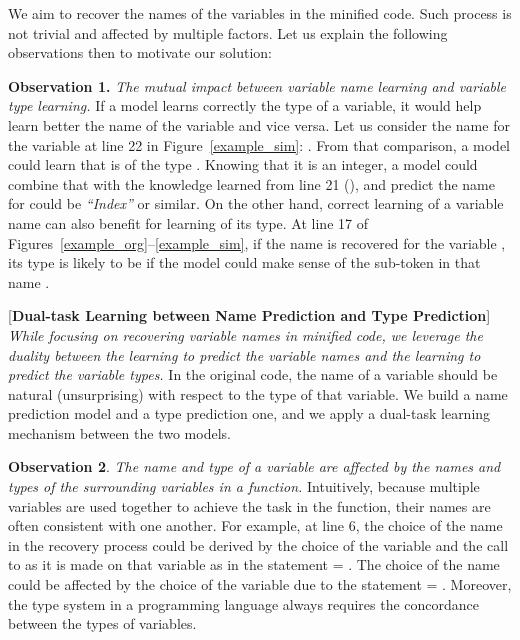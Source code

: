 We aim to recover the names of the variables in the minified
code. Such process is not trivial and affected by multiple factors.
Let us explain the following observations then to motivate our
solution:

\vspace{2pt} \textbf{Observation 1.} {\em The mutual impact between
  variable name learning and variable type learning.} If a model
learns correctly the type of a variable, it would help learn better
the name of the variable and vice versa. Let us consider the name
 for the variable  at line 22 in
Figure~\ref{example_sim}: . From that comparison, a
model could learn that  is of the type . Knowing
that it is an integer, a model could combine that with the knowledge
learned from line 21 (), and predict the
name for  could be {\em ``Index''} or similar. On the other
hand, correct learning of a variable name can also benefit for
learning of its type. At line 17 of
Figures~\ref{example_org}--\ref{example_sim}, if the name
 is recovered for the variable ,
its type is likely to be  if the model could make sense of
the sub-token  in that name .

\vspace{2pt}  [{\bf Dual-task Learning
    between Name Prediction and Type Prediction}] {\em While focusing
  on recovering variable names in minified code, we leverage the
  duality between the learning to predict the variable names and the
  learning to predict the variable types.} In the original code, the
name of a variable should be natural (unsurprising) with respect to
the type of that variable. We build a name prediction model and a type
prediction one, and we apply a dual-task learning mechanism between
the two models.

\vspace{2pt}
\textbf{Observation 2}. {\em The name and type of a variable are
  affected by the names and types of the surrounding variables in a
  function.}  Intuitively, because multiple variables are used
together to achieve the task in the function, their names are
often consistent with one another. For example, at line 6, the choice
of the name  in the recovery process could be derived
by the choice of the variable  and the call to
 as it is made on that variable as in the statement
 = . The choice of the name
 could be affected by the choice of the
variable  due to the statement  =
. Moreover, the type system in a programming
language always requires the concordance between the types of
variables.

